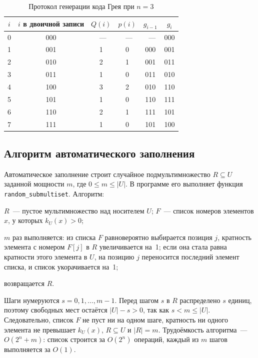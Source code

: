 \documentclass[14pt,a4paper]{extarticle}
\newcommand{\code}[1]{\texttt{#1}}
\newcommand{\us}{\_\allowbreak{}}
\newcommand{\kU}{k_U(x)}
\begin{document}
\begin{table}[htbp]
\caption{Протокол генерации кода Грея при $n = 3$}\label{tab:gray3}
\centering
\begin{tabular}{|c|c|c|c|c|c|}
\hline
$i$ & $i$ в двоичной записи & $Q(i)$ & $p(i)$ & $g_{i-1}$ & $g_i$ \\\hline
0 & 000 &~--- &~--- &~--- & 000 \\\hline
1 & 001 & 1 & 0 & 000 & 001 \\\hline
2 & 010 & 2 & 1 & 001 & 011 \\\hline
3 & 011 & 1 & 0 & 011 & 010 \\\hline
4 & 100 & 3 & 2 & 010 & 110 \\\hline
5 & 101 & 1 & 0 & 110 & 111 \\\hline
6 & 110 & 2 & 1 & 111 & 101 \\\hline
7 & 111 & 1 & 0 & 101 & 100 \\\hline
\end{tabular}
\end{table}

\FloatBarrier
\subsection{Алгоритм автоматического заполнения}

Автоматическое заполнение строит случайное подмультимножество $R \subseteq U$ заданной мощности $m$, где $0 \leqslant m \leqslant |U|$. В программе его выполняет функция \code{random\us{}submultiset}. Алгоритм:
\begin{steps}
\item $R$~--- пустое мультимножество над носителем $U$; $F$~--- список номеров элементов $x$, у которых $\kU > 0$;
\item $m$ раз выполняется: из списка $F$ равновероятно выбирается позиция $j$, кратность элемента с номером $F[j]$ в $R$ увеличивается на~1; если она стала равна кратности этого элемента в $U$, на позицию $j$ переносится последний элемент списка, и список укорачивается на~1;
\item возвращается $R$.
\end{steps}

Шаги нумеруются $s = 0, 1, \ldots, m - 1$. Перед шагом $s$ в $R$ распределено $s$ единиц, поэтому свободных мест остаётся $|U| - s > 0$, так как $s < m \leqslant |U|$. Следовательно, список $F$ не пуст ни на одном шаге, кратность ни одного элемента не превышает $\kU$, $R \subseteq U$ и $|R| = m$. Трудоёмкость алгоритма~--- $O(2^n + m)$: список строится за $O(2^n)$ операций, каждый из $m$ шагов выполняется за $O(1)$.
\end{document}
